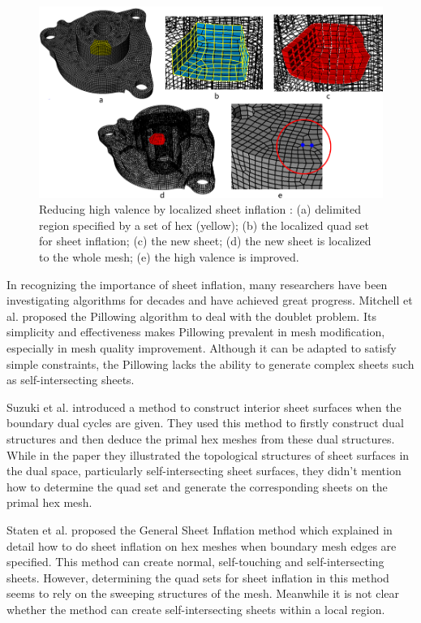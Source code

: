 \documentclass[final,5p,times,twocolumn]{elsarticle}
\begin{document}
\begin{figure}[htbp]
\begin{center}
\includegraphics[width=15cm]{rev_figures/intro_high_val_localized_inf.png}
\caption{Reducing high valence by localized sheet inflation : (a) delimited region specified by a set of hex (yellow); (b) the localized quad set for sheet inflation; (c) the new sheet; (d) the new sheet is localized to the whole mesh; (e) the high valence is improved.}
\label{fig:intro_high_val_localized_inf}
\end{center}
\end{figure}

In recognizing the importance of sheet inflation, many researchers have been investigating algorithms for decades and have achieved great progress. Mitchell et al. proposed the Pillowing algorithm to deal with the doublet problem\cite{Mitchell:1995wa}.  Its simplicity and effectiveness makes Pillowing prevalent in mesh modification, especially in mesh quality improvement. Although it can be adapted to satisfy simple constraints, the Pillowing lacks the ability to generate complex sheets such as self-intersecting sheets.

Suzuki et al. introduced a method to construct interior sheet surfaces when the boundary dual cycles are given\cite{Suzuki:2010hn}. They used this method to firstly construct dual structures and then deduce the primal hex meshes from these dual structures. While in the paper they illustrated the topological structures of sheet surfaces in the dual space, particularly self-intersecting sheet surfaces, they didn't mention how to determine the quad set and generate the corresponding sheets on the primal hex mesh.

Staten et al. proposed the General Sheet Inflation method which explained in detail how to do sheet inflation on hex meshes when boundary mesh edges are specified\cite{Staten:2009bo}. This method can create normal, self-touching and self-intersecting sheets. However, determining the quad sets for sheet inflation in this method seems to rely on the sweeping structures of the mesh. Meanwhile it is not clear whether the method can create self-intersecting sheets within a local region.
\end{document}
